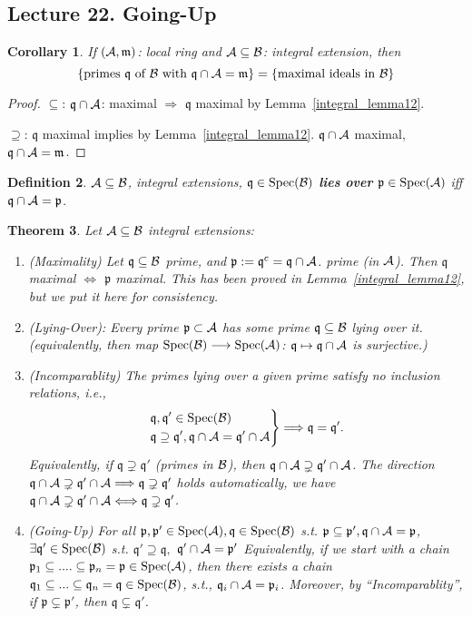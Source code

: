 \documentclass[11pt]{article}
\newtheorem{thm}{Theorem}[section]
\newtheorem{cor}[thm]{Corollary}
\newtheorem{dfn}[thm]{Definition}
\newcommand{\scm}{{\mathfrak m}}
\newcommand{\scp}{{\mathfrak p}}
\newcommand{\scq}{\mathfrak q}
\newcommand{\cala}{{\cal A}}
\newcommand{\calb}{{\cal B}}
\newcommand{\Lrta}{\Longrightarrow}
\newcommand{\lrta}{\longrightarrow}
\newcommand{\Llrta}{\Longleftrightarrow}
\begin{document}
\subsection{Lecture 22. Going-Up}
\begin{cor}
If $(\cala,\scm)$: local ring and $\cala\subseteq \calb$: integral extension, then 
$$
\{\text{primes $\scq$ of $\calb$ with $\scq\cap\cala=\scm$}\}=\{\text{maximal ideals in $\calb$}\}
$$
\end{cor}
\begin{proof}
$\subseteq$: $\scq\cap \cala$: maximal $\Lrta$ $\scq$ maximal by Lemma~\ref{integral_lemma12}.

$\supseteq$: $\scq$ maximal implies by Lemma~\ref{integral_lemma12}. $\scq\cap \cala$ maximal, $\scq\cap\cala=\scm$.
\end{proof}
\begin{dfn}
$\cala\subseteq \calb$, integral extensions, $\scq\in \text{Spec}(\calb)$ \textbf{lies over} $\scp\in \text{Spec}(\cala)$ iff $\scq\cap\cala=\scp$.
\end{dfn}
\begin{thm}\label{thm:integral_extension_primes_properties}
Let $\cala\subseteq \calb$ integral extensions:
\begin{enumerate}[label=(\roman*)]
\item (Maximality)  Let $\scq\subseteq \calb$ prime, and $\scp:=\scq^{c}=\scq\cap \cala$. prime (in $\cala$). Then 
$\scq$ maximal $\Llrta$ $\scp$ maximal. This has been proved in Lemma~\ref{integral_lemma12}, but we put it here for consistency.
\item (Lying-Over): Every  prime $\scp\subset\cala$ has some prime $\scq\subseteq \calb$ lying over it. (equivalently, then map $\text{Spec}(\calb)\lrta \text{Spec}(\cala)$: $\scq\mapsto \scq\cap \cala$ is surjective.)

\item (Incomparablity) The primes lying over a given prime satisfy no inclusion relations, i.e.,
$$
\left.
\begin{aligned}
&\scq,\scq'\in \text{Spec}(\calb)\\
& \scq\supseteq\scq', \scq\cap\cala=\scq'\cap\cala
\end{aligned}
\right\}\Lrta \scq=\scq'.
$$
Equivalently, if $\scq\supsetneq \scq'$ (primes in $\calb$), then $\scq\cap\cala\supsetneq \scq'\cap\cala$. The direction $\scq\cap\cala\supsetneq \scq'\cap\cala\Lrta \scq\supsetneq \scq'$ holds automatically, we have $\scq\cap\cala\supsetneq \scq'\cap\cala\Llrta \scq\supsetneq \scq'$. 
\item (Going-Up) For all $\scp,\scp'\in \text{Spec}(\cala),\scq\in \text{Spec}(\calb)$ s.t. $\scp\subseteq \scp',\scq\cap\cala=\scp$, \\
$\exists \scq'\in \text{Spec}(\calb)$ s.t. $\scq'\supseteq \scq,$ $\scq'\cap \cala=\scp'$
Equivalently, if we start with a chain 
$\scp_1\subseteq ....\subseteq \scp_n=\scp\in \text{Spec}(\cala)$, then there exists a chain 
$\scq_1\subseteq ...\subseteq \scq_n=\scq\in \text{Spec}(\calb)$, s.t., $\scq_i\cap\cala=\scp_i$. 
Moreover, by ``Incomparablity'', if $\scp\subsetneq \scp'$, then $\scq\subsetneq \scq'$.
\end{enumerate}
\end{thm}
\end{document}
